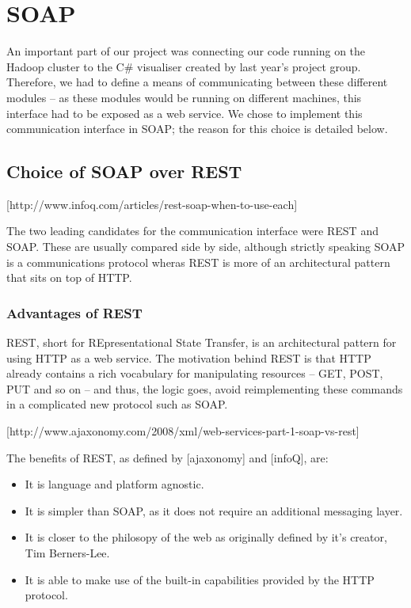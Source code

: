 \section{SOAP}

An important part of our project was connecting our code running on the Hadoop cluster to the C\# visualiser created by last year's project group. Therefore, we had to define a means of communicating between these different modules -- as these modules would be running on different machines, this interface had to be exposed as a web service. We chose to implement this communication interface in SOAP; the reason for this choice is detailed below.

\subsection{Choice of SOAP over REST}

[http://www.infoq.com/articles/rest-soap-when-to-use-each]

The two leading candidates for the communication interface were REST and SOAP. These are usually compared side by side, although strictly speaking SOAP is a communications protocol wheras REST is more of an architectural pattern that sits on top of HTTP.

\subsubsection{Advantages of REST}

REST, short for REpresentational State Transfer, is an architectural pattern for using HTTP as a web service. The motivation behind REST is that HTTP already contains a rich vocabulary for manipulating resources -- GET, POST, PUT and so on -- and thus, the logic goes, avoid reimplementing these commands in a complicated new protocol such as SOAP.

[http://www.ajaxonomy.com/2008/xml/web-services-part-1-soap-vs-rest]

The benefits of REST, as defined by [ajaxonomy] and [infoQ], are:
\begin{itemize}
\item It is language and platform agnostic.
\item It is simpler than SOAP, as it does not require an additional messaging
layer.
\item It is closer to the philosopy of the web as originally defined by it's
creator, Tim Berners-Lee.
\item It is able to make use of the built-in capabilities provided by the HTTP
protocol.
\end{itemize}

